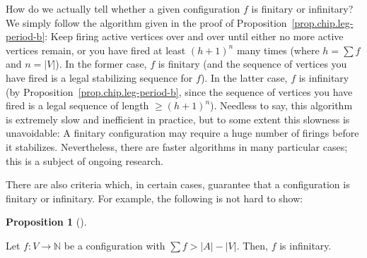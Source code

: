 \documentclass[numbers=enddot,12pt,final,onecolumn,notitlepage]{scrartcl}%
\theoremstyle{definition}
\newtheorem{prop}[theo]{Proposition}
\newenvironment{proposition}[1][]
{\begin{prop}[#1]\begin{leftbar}}
{\end{leftbar}\end{prop}}
\let\sumnonlimits\sum
\renewcommand{\sum}{\sumnonlimits\limits}
\newcommand{\NN}{\mathbb{N}}
\newcommand{\abs}[1]{\left| #1 \right|}
\newcommand{\tup}[1]{\left( #1 \right)}
\begin{document}
How do we actually tell whether a given configuration $f$
is finitary or infinitary?
We simply follow the algorithm given in the proof of
Proposition~\ref{prop.chip.leg-period-b}:
Keep firing active vertices over and over until either no
more active vertices remain, or you have fired at least
$\tup{h+1}^n$ many times
(where $h = \sum f$ and $n = \abs{V}$).
In the former case, $f$ is finitary (and the sequence
of vertices you have fired is a legal stabilizing sequence
for $f$).
In the latter case, $f$ is infinitary (by
Proposition~\ref{prop.chip.leg-period-b},
since the sequence of vertices you have fired is a
legal sequence of length $\geq \tup{h+1}^n$).
Needless to say, this algorithm is extremely slow and
inefficient in practice, but to some extent this slowness
is unavoidable:
A finitary configuration may require a huge number of firings
before it stabilizes.
Nevertheless, there are faster algorithms in many particular
cases; this is a subject of ongoing research.

There are also criteria which, in certain cases, guarantee
that a configuration is finitary or infinitary.
For example, the following is not hard to show:

\begin{proposition} \label{prop.chip.infinitary-by-pigeon}
Let $f : V \to \NN$ be a
configuration with $\sum f > \abs{A} - \abs{V}$.
Then, $f$ is infinitary.
\end{proposition}
\end{document}
